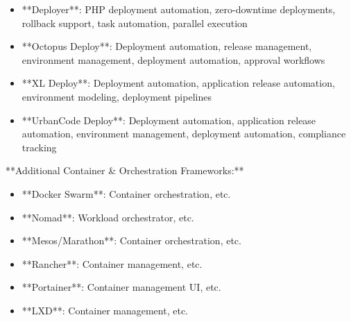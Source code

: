 \documentclass[11pt,a4paper]{article}
\begin{document}
\begin{itemize}
\item **Deployer**: PHP deployment automation, zero-downtime deployments, rollback support, task automation, parallel execution
\end{itemize}

\begin{itemize}
\item **Octopus Deploy**: Deployment automation, release management, environment management, deployment automation, approval workflows
\end{itemize}

\begin{itemize}
\item **XL Deploy**: Deployment automation, application release automation, environment modeling, deployment pipelines
\end{itemize}

\begin{itemize}
\item **UrbanCode Deploy**: Deployment automation, application release automation, environment management, deployment automation, compliance tracking
\end{itemize}

**Additional Container \& Orchestration Frameworks:**

\begin{itemize}
\item **Docker Swarm**: Container orchestration, etc.
\end{itemize}

\begin{itemize}
\item **Nomad**: Workload orchestrator, etc.
\end{itemize}

\begin{itemize}
\item **Mesos/Marathon**: Container orchestration, etc.
\end{itemize}

\begin{itemize}
\item **Rancher**: Container management, etc.
\end{itemize}

\begin{itemize}
\item **Portainer**: Container management UI, etc.
\end{itemize}

\begin{itemize}
\item **LXD**: Container management, etc.
\end{itemize}
\end{document}
